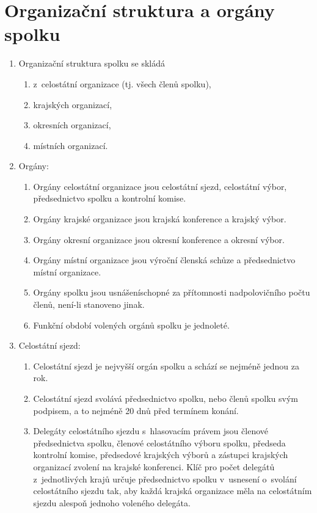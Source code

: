 \documentclass[a4paper]{article}
\begin{document}
\section{Organizační struktura a orgány spolku}
    \begin{enumerate}
    \item Organizační struktura spolku se skládá
        \begin{enumerate}
        \item z~celostátní organizace (tj. všech členů spolku),
        \item krajských organizací,
        \item okresních organizací,
        \item místních organizací.
        \end{enumerate}

    \item Orgány:
        \begin{enumerate}
        \item Orgány celostátní organizace jsou celostátní sjezd,
            celostátní výbor,
            předsednictvo spolku a kontrolní komise.
        \item Orgány krajské organizace jsou krajská konference a krajský
            výbor.
        \item Orgány okresní organizace jsou okresní konference a okresní výbor.
        \item Orgány místní organizace jsou výroční členská schůze a
            předsednictvo místní organizace.
        \item Orgány spolku jsou usnášeníschopné za přítomnosti nadpolovičního počtu
            členů, není-li stanoveno jinak.
        \item Funkční období volených orgánů spolku je jednoleté.
        \end{enumerate}

    \item Celostátní sjezd:
        \begin{enumerate}
        \item Celostátní sjezd je nejvyšší orgán spolku a schází se nejméně
            jednou za rok.

        \item Celostátní sjezd svolává předsednictvo spolku, nebo
             členů spolku svým podpisem, a to nejméně 20 dnů
            před termínem konání.

        \item Delegáty celostátního sjezdu s~hlasovacím právem jsou členové
            předsednictva spolku, členové celostátního výboru spolku,
            předseda kontrolní komise, předsedové krajských výborů a zástupci
            krajských organizací zvolení na krajské konferenci. Klíč pro počet
            delegátů z~jednotlivých krajů určuje předsednictvo spolku
            v~usnesení o~svolání celostátního sjezdu tak, aby každá krajská
            organizace měla na celostátním sjezdu alespoň jednoho voleného
            delegáta.


\end{enumerate}
\end{enumerate}
\end{document}
